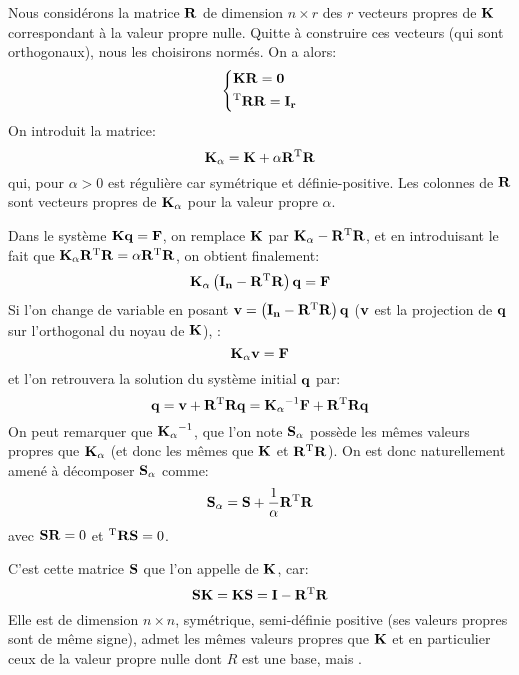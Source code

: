 \medskip
Nous considérons la matrice $\mathbf{R}$ de dimension $n\times r$ des $r$ vecteurs propres de $\mathbf{K}$
correspondant à la valeur propre nulle. Quitte à construire ces vecteurs (qui sont orthogonaux),
nous les choisirons normés. On a alors:
\begin{equation}
\left\{
\begin{aligned}
&\mathbf{K}\mathbf{R}=\mathbf{0}\\
&{}^\mathrm{T}\mathbf{R}\mathbf{R}=\mathbf{I_r}
\end{aligned}
\right.
\end{equation}
On introduit la matrice:
\begin{equation} \mathbf{K_\alpha} = \mathbf{K}+\alpha \mathbf{R}{}^\mathrm{T}\mathbf{R} \end{equation}
qui, pour $\alpha>0$ est régulière car symétrique et définie-positive.
Les colonnes de $\mathbf{R}$ sont vecteurs propres de $\mathbf{K_\alpha}$ pour la valeur propre $\alpha$.

Dans le système $\mathbf{K}\mathbf{q}=\mathbf{F}$, on remplace $\mathbf{K}$ par $\mathbf{K_\alpha}-\mathbf{R}{}^\mathrm{T}\mathbf{R}$, et en introduisant le
fait que $\mathbf{K_\alpha}\mathbf{R}{}^\mathrm{T}\mathbf{R}=\alpha \mathbf{R}{}^\mathrm{T}\mathbf{R}$, on obtient finalement:
\begin{equation}
\mathbf{K_\alpha} \left(\mathbf{I_n}-\mathbf{R}{}^\mathrm{T}\mathbf{R}\right)\mathbf{q}=\mathbf{F}
\end{equation}
Si l'on change de variable en posant $\mathbf{v}=\left(\mathbf{I_n}-\mathbf{R}{}^\mathrm{T}\mathbf{R}\right)\mathbf{q}$ ($\mathbf{v}$ est la projection de
$\mathbf{q}$ sur l'orthogonal du noyau de $\mathbf{K}$), :
\begin{equation}
\mathbf{K_\alpha}\mathbf{v}=\mathbf{F}
\end{equation}
et l'on retrouvera la solution du système initial $\mathbf{q}$ par:
\begin{equation}\mathbf{q}=\mathbf{v}+\mathbf{R}{}^\mathrm{T}\mathbf{R}\mathbf{q} = \mathbf{K_\alpha}^{-1}\mathbf{F}+\mathbf{R}{}^\mathrm{T}\mathbf{R}\mathbf{q}\end{equation}
\medskip
On peut remarquer que $\mathbf{K_\alpha}^{-1}$, que l'on note $\mathbf{S_\alpha}$ possède les mêmes
valeurs propres que $\mathbf{K_\alpha}$ (et donc les mêmes que $\mathbf{K}$ et $\mathbf{R}{}^\mathrm{T}\mathbf{R}$). On est donc
naturellement amené à décomposer $\mathbf{S_\alpha}$ comme:
\begin{equation} \mathbf{S_\alpha}=\mathbf{S}+\frac1\alpha \mathbf{R}{}^\mathrm{T}\mathbf{R}\end{equation}
avec $\mathbf{S}\mathbf{R}=0$ et ${}^\mathrm{T}\mathbf{R}\mathbf{S}=0$.

C'est cette matrice $\mathbf{S}$ que l'on appelle  de $\mathbf{K}$, car:
\begin{equation} \mathbf{S}\mathbf{K} = \mathbf{K}\mathbf{S} = \mathbf{I} -\mathbf{R}{}^\mathrm{T}\mathbf{R}\end{equation}
Elle est de dimension $n\times n$, symétrique, semi-définie positive (ses valeurs propres
sont de même signe), admet les mêmes valeurs propres que $\mathbf{K}$ et en particulier ceux
de la valeur propre nulle dont $R$ est une base, mais .


